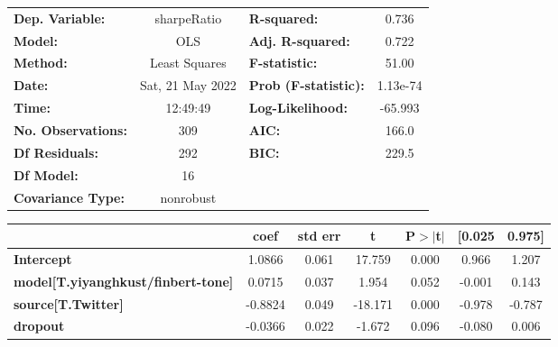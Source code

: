 \begin{center}
\begin{tabular}{lclc}
\toprule
\textbf{Dep. Variable:}                    &   sharpeRatio    & \textbf{  R-squared:         } &     0.736   \\
\textbf{Model:}                            &       OLS        & \textbf{  Adj. R-squared:    } &     0.722   \\
\textbf{Method:}                           &  Least Squares   & \textbf{  F-statistic:       } &     51.00   \\
\textbf{Date:}                             & Sat, 21 May 2022 & \textbf{  Prob (F-statistic):} &  1.13e-74   \\
\textbf{Time:}                             &     12:49:49     & \textbf{  Log-Likelihood:    } &   -65.993   \\
\textbf{No. Observations:}                 &         309      & \textbf{  AIC:               } &     166.0   \\
\textbf{Df Residuals:}                     &         292      & \textbf{  BIC:               } &     229.5   \\
\textbf{Df Model:}                         &          16      & \textbf{                     } &             \\
\textbf{Covariance Type:}                  &    nonrobust     & \textbf{                     } &             \\
\bottomrule
\end{tabular}
\begin{tabular}{lcccccc}
                                           & \textbf{coef} & \textbf{std err} & \textbf{t} & \textbf{P$> |$t$|$} & \textbf{[0.025} & \textbf{0.975]}  \\
\midrule
\textbf{Intercept}                         &       1.0866  &        0.061     &    17.759  &         0.000        &        0.966    &        1.207     \\
\textbf{model[T.yiyanghkust/finbert-tone]} &       0.0715  &        0.037     &     1.954  &         0.052        &       -0.001    &        0.143     \\
\textbf{source[T.Twitter]}                 &      -0.8824  &        0.049     &   -18.171  &         0.000        &       -0.978    &       -0.787     \\
\textbf{dropout}                           &      -0.0366  &        0.022     &    -1.672  &         0.096        &       -0.080    &        0.006     \\

\end{tabular}
\end{center}
